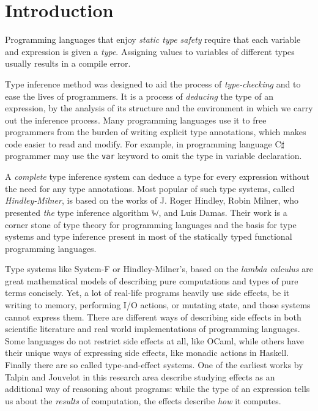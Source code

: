 \documentclass[declaration,shortabstract]{iithesis}
\author         {Dominik Gulczyński}
\theoremstyle{definition} \newtheorem{definition}{Definition}[section]
\begin{document}
\chapter{Introduction}

Programming languages that enjoy \textit{static type safety} require that
each variable and expression is given a \textit{type}.
Assigning values to variables of different types usually results in a compile error.

Type inference method was designed to aid the process of \textit{type-checking}
and to ease the lives of programmers. It is a process of \textit{deducing}
the type of an expression, by the analysis of its structure and the environment
in which we carry out the inference process. 
Many programming languages use it to free programmers from the burden of writing
explicit type annotations, which makes code easier to read and modify.
For example, in programming language C$\sharp$ programmer may
use the \texttt{var} keyword to omit the type in variable declaration.

A \textit{complete} type inference system can deduce a type for every
expression without the need for any type annotations.
Most popular of such type systems, called \textit{Hindley-Milner}, is based on the
works of J. Roger Hindley\cite{hindley},
Robin Milner, who presented \textit{the} type inference algorithm $\mathbb{W}$\cite{milner},
and Luis Damas\cite{principal}.
Their work is a corner stone of type theory for programming languages
and the basis for type systems and type inference present in most of the statically typed
functional programming languages.

Type systems like System-F or Hindley-Milner's, based on the \textit{lambda calculus}
are great mathematical models of describing pure computations and types of pure terms concisely.
Yet, a lot of real-life programs heavily use side effects,
be it writing to memory, performing I/O actions, or mutating state, and those systems cannot express them.
There are different ways of describing side effects in both scientific literature
and real world implementations of programming languages.
Some languages do not restrict side effects at all, like OCaml,
while others have their unique ways of expressing side effects,
like monadic actions in Haskell.
Finally there are so called type-and-effect systems.
One of the earliest works by Talpin and Jouvelot\cite{talpin}
in this research area describe studying effects as an additional way of reasoning about programs:
while the type of an expression tells us about the \textit{results} of computation,
the effects describe \textit{how} it computes.
\end{document}
